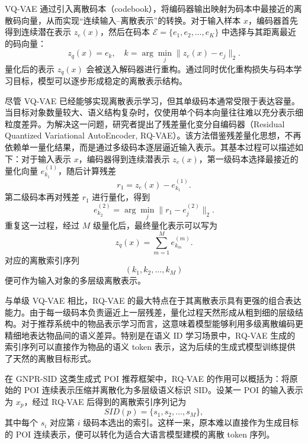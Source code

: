 VQ-VAE 通过引入离散码本（codebook），将编码器输出映射为码本中最接近的离散码向量，从而实现“连续输入--离散表示”的转换。对于输入样本 $x$，编码器首先得到连续潜在表示 $z_e(x)$，然后在码本 $\mathcal{E}=\{e_1,e_2,\dots,e_K\}$ 中选择与其距离最近的码向量：
\begin{equation}
z_q(x)=e_k,\quad k=\arg\min_j \|z_e(x)-e_j\|_2.
\end{equation}
量化后的表示 $z_q(x)$ 会被送入解码器进行重构。通过同时优化重构损失与码本学习目标，模型可以逐步形成稳定的离散表示结构。

尽管 VQ-VAE 已经能够实现离散表示学习，但其单级码本通常受限于表达容量。当目标对象数量较大、语义结构复杂时，仅使用单个码本向量往往难以充分表示细粒度差异。为解决这一问题，研究者提出了残差量化变分自编码器（Residual Quantized Variational AutoEncoder, RQ-VAE）。该方法借鉴残差量化思想，不再依赖单一量化结果，而是通过多级码本逐层逼近输入表示。其基本过程可以描述如下：对于输入表示 $x$，编码器得到连续潜表示 $z_e(x)$，第一级码本选择最接近的量化向量 $e_{k_1}^{(1)}$，随后计算残差
\begin{equation}
r_1=z_e(x)-e_{k_1}^{(1)}.
\end{equation}
第二级码本再对残差 $r_1$ 进行量化，得到
\begin{equation}
e_{k_2}^{(2)}=\arg\min_j \|r_1-e_j^{(2)}\|_2.
\end{equation}
重复这一过程，经过 $M$ 级量化后，最终量化表示可以写为
\begin{equation}
z_q(x)=\sum_{m=1}^{M} e_{k_m}^{(m)}.
\end{equation}
对应的离散索引序列
\begin{equation}
(k_1,k_2,\dots,k_M)
\end{equation}
便可作为输入对象的多层级离散表示。

与单级 VQ-VAE 相比，RQ-VAE 的最大特点在于其离散表示具有更强的组合表达能力。由于每一级码本负责逼近上一层残差，量化过程天然形成从粗到细的层级结构。对于推荐系统中的物品表示学习而言，这意味着模型能够利用多级离散编码更精细地表达物品间的语义差异。特别是在语义 ID 学习场景中，RQ-VAE 生成的索引序列可以直接作为物品的语义 token 表示，这为后续的生成式模型训练提供了天然的离散目标形式。

在 GNPR-SID 这类生成式 POI 推荐框架中，RQ-VAE 的作用可以概括为：将原始的 POI 连续表示压缩并离散化为多层级语义标识 SID。设某一 POI 的输入表示为 $x_p$，经过 RQ-VAE 后得到的离散索引序列记为
\begin{equation}
SID(p)=\{s_1,s_2,\dots,s_M\},
\end{equation}
其中每个 $s_i$ 对应第 $i$ 级码本选出的索引。这样一来，原本难以直接作为生成目标的 POI 连续表示，便可以转化为适合大语言模型建模的离散 token 序列。

